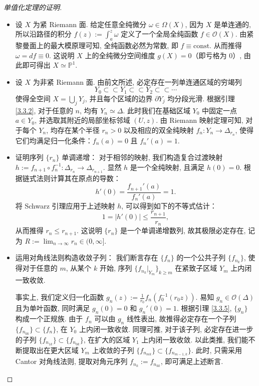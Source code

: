 \begin{proof}[单值化定理的证明]
\begin{itemize}
    \item [(a)]\qquad 设 $X$ 为紧 Riemann 面. 给定任意全纯微分 $\omega \in \Omega(X)$, 因为 $X$ 是单连通的, 所以沿路径的积分 $f(z) := \int_a^z \omega$ 定义了一个全局全纯函数 $f \in \mathcal{O}(X)$. 由紧黎曼面上的最大模原理可知, 全纯函数必然为常数, 即 $f \equiv \mathrm{const}$. 从而推得 $\omega = df \equiv 0$. 这说明 $X$ 上的全纯微分空间维度 $g(X) = 0$（即亏格为 0）, 由此即可得出 $X \simeq \mathbb{P}^1$. 

    \item[(b)]\qquad 设 $X$ 为非紧 Riemann 面. 由前文所述, 必定存在一列单连通区域的穷竭列
\[ Y_0 \subset\subset Y_1 \subset\subset Y_2 \subset\subset \cdots \]
使得全空间 $X = \bigcup_j Y_j$, 并且每个区域的边界 $\partial Y_j$ 均分段光滑. 根据引理 \ref{3.3.2}, 对于任意的 $n$, 均有 $Y_n \simeq \Delta$. 
此时我们在基础区域 $Y_0$ 中固定一点 $a \in Y_0$, 并选取其附近的局部坐标邻域 $(U, z)$. 由 Riemann 映射定理可知, 对于每个 $Y_n$, 均存在某个半径 $r_n > 0$ 以及相应的双全纯映射 $f_n : Y_n \to \Delta_{r_n}$, 使得它们均满足归一化条件：$f_n(a) = 0$ 且 $f_n'(a) = 1$. 

\item[(c)]\qquad 证明序列 $\{r_n\}$ 单调递增：
对于相邻的映射, 我们构造复合过渡映射 $h := f_{n+1} \circ f_n^{-1} : \Delta_{r_n} \to \Delta_{r_{n+1}}$. 显然 $h$ 是一个全纯映射, 且满足 $h(0)=0$. 根据链式法则计算其在原点的导数：
\[ h'(0) = \frac{f_{n+1}'(a)}{f_n'(a)} = 1. \]
将 Schwarz 引理应用于上述映射 $h$, 可以得到如下的不等式估计：
\[ 1 = |h'(0)| \leqslant \frac{r_{n+1}}{r_n}, \]
从而推得 $r_n \leqslant r_{n+1}$. 这说明 $\{r_n\}$ 是一个单调递增数列, 故其极限必定存在, 记为 $R := \lim_{n \to \infty} r_n \in (0, \infty]$. 

\item[(d)]\qquad 运用对角线法则构造收敛子列：
我们断言存在 $\{f_n\}$ 的一个公共子列 $\{f_{n_k}\}$, 使得对于任意的 $m$, 从某个 $k$ 开始, 序列 $\{f_{n_k}|_{Y_m}\}_{k \geqslant m}$ 在紧致子区域 $Y_m$ 上内闭一致收敛. 

\qquad 事实上, 我们定义归一化函数 $g_n(z) := \frac{1}{r_0} f_n(f_0^{-1}(r_0 z))$. 易知 $g_n \in \mathcal{O}(\Delta)$ 且为单叶函数, 同时满足 $g_n(0)=0$ 和 $g_n'(0)=1$. 根据引理 \ref{3.3.5}, $\{g_n\}$ 构成一个正规族. 由于 $f_n$ 可以由 $g_n$ 线性表出, 故推得必定存在一个子列 $\{f_{n_{0k}}\} \subset \{f_n\}$, 在 $Y_0$ 上内闭一致收敛. 
同理可推, 对于该子列, 必定存在进一步的子列 $\{f_{n_{1k}}\} \subset \{f_{n_{0k}}\}$, 在扩大的区域 $Y_1$ 上内闭一致收敛. 以此类推, 我们能不断提取出在更大区域 $Y_m$ 上收敛的子列 $\{f_{n_{mk}}\} \subset \{f_{n_{m-1,k}}\}$. 此时, 只需采用 Cantor 对角线法则, 提取对角元序列 $f_{n_k} := f_{n_{kk}}$, 即可满足上述断言. 


\end{itemize}
\end{proof}

